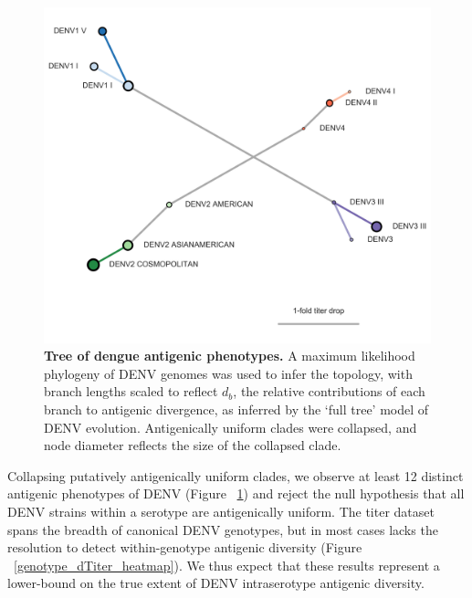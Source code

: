 \documentclass[11pt,oneside,letterpaper]{article}
\begin{document}
\begin{figure}[h]
  \begin{centering}
    \includegraphics[width=.8\linewidth]{../figures/png/antigenic_tree.png}
    \caption{\textbf{Tree of dengue antigenic phenotypes.}  A maximum likelihood phylogeny of DENV genomes was used to infer the topology, with branch lengths scaled to reflect $d_b$, the relative contributions of each branch to antigenic divergence, as inferred by the `full tree' model of DENV evolution. Antigenically uniform clades were collapsed, and node diameter reflects the size of the collapsed clade.}
     \label{antigenic_tree}
  \end{centering}
\end{figure}

Collapsing putatively antigenically uniform clades, we observe at least 12 distinct antigenic phenotypes of DENV (Figure ~\ref{antigenic_tree}) and reject the null hypothesis that all DENV strains within a serotype are antigenically uniform.
The titer dataset spans the breadth of canonical DENV genotypes, but in most cases lacks the resolution to detect within-genotype antigenic diversity (Figure ~\ref{genotype_dTiter_heatmap}).
We thus expect that these results represent a lower-bound on the true extent of DENV intraserotype antigenic diversity.
\end{document}
